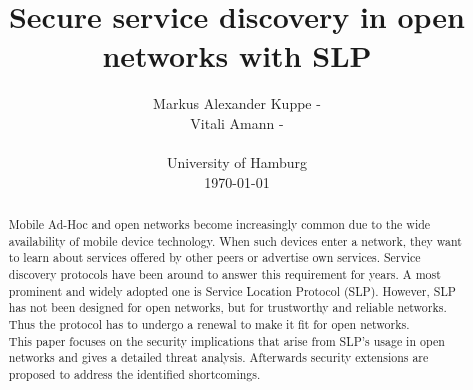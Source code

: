 \title{Secure service discovery in open networks with SLP}
\author{
Markus Alexander Kuppe - \\
Vitali Amann - \\\\
University of Hamburg\\
\today
}

\maketitle

\begin{abstract}
Mobile Ad-Hoc and open networks become increasingly common due to the wide availability of mobile device technology. When such devices enter a network, they want to learn about services offered by other peers or advertise own services. Service discovery protocols have been around to answer this requirement for years. A most prominent and widely adopted one is Service Location Protocol (SLP). However, SLP has not been designed for open networks, but for trustworthy and reliable networks. Thus the protocol has to undergo a renewal to make it fit for open networks.\\
This paper focuses on the security implications that arise from SLP's usage in open networks and gives a detailed threat analysis. Afterwards security extensions are proposed to address the identified shortcomings.
\end{abstract}

